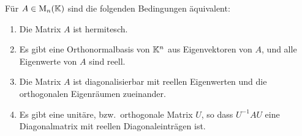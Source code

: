\begin{corollary}
  \label{corollary: hermitian matrices are diagonalizable}
  Für $A \in \operatorname{M}_{n}(\mathbb{K})$ sind die folgenden Bedingungen äquivalent:
  \begin{enumerate}
    \item
      Die Matrix $A$ ist hermitesch.
    \item
      Es gibt eine Orthonormalbasis von $\mathbb{K}^n$ aus Eigenvektoren von $A$, und alle Eigenwerte von $A$ sind reell.
    \item
      Die Matrix $A$ ist diagonalisierbar mit reellen Eigenwerten und die orthogonalen Eigenräumen zueinander.
    \item
      Es gibt eine unitäre, bzw.\ orthogonale Matrix $U$, so dass $U^{-1} A U$ eine Diagonalmatrix mit reellen Diagonaleinträgen ist.
  \end{enumerate}
\end{corollary}

